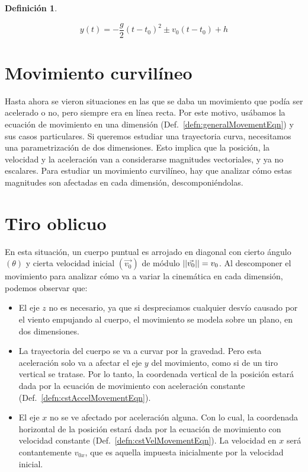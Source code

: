 \documentclass[a5paper,12pt,twoside]{book}
\newtheorem{defn}{{Definición}}[chapter]
\begin{document}
\begin{mdframed}[style=MyFrame1]
    \begin{defn}
    \end{defn}
    \begin{equation*}
        y(t) = -\frac{g}{2}(t-t_0)^2 \pm v_0(t-t_0) + h
    \end{equation*}
\end{mdframed}


\section{Movimiento curvilíneo}

Hasta ahora se vieron situaciones en las que se daba un movimiento que podía ser acelerado o no, pero siempre era en línea recta.
Por este motivo, usábamos la ecuación de movimiento en una dimensión (Def.\ \ref{defn:generalMovementEqn}) y sus casos particulares.
Si queremos estudiar una trayectoria curva, necesitamos una parametrización de dos dimensiones.
Esto implica que la posición, la velocidad y la aceleración van a considerarse magnitudes vectoriales, y ya no escalares.
Para estudiar un movimiento curvilíneo, hay que analizar cómo estas magnitudes son afectadas en cada dimensión, descomponiéndolas.


\section{Tiro oblicuo}
\label{subsec:parabolicMotion}

En esta situación, un cuerpo puntual es arrojado en diagonal con cierto ángulo $(\theta)$ y cierta velocidad inicial $(\Vec{v_0})$ de módulo ${\left|\left| {\Vec{v_0}} \right|\right|} = v_0$.
Al descomponer el movimiento para analizar cómo va a variar la cinemática en cada dimensión, podemos observar que:
\begin{itemize}
    \item
    El eje $z$ no es necesario, ya que si despreciamos cualquier desvío causado por el viento empujando al cuerpo, el movimiento se modela sobre un plano, en dos dimensiones.
    
    \item
    La trayectoria del cuerpo se va a curvar por la gravedad.
    Pero esta aceleración solo va a afectar el eje $y$ del movimiento, como si de un tiro vertical se tratase.
    Por lo tanto, la coordenada vertical de la posición estará dada por la ecuación de movimiento con aceleración constante (Def.\ \ref{defn:cstAccelMovementEqn}).
    
    \item
    El eje $x$ no se ve afectado por aceleración alguna.
    Con lo cual, la coordenada horizontal de la posición estará dada por la ecuación de movimiento con velocidad constante (Def.\ \ref{defn:cstVelMovementEqn}).
    La velocidad en $x$ será contantemente $v_{0x}$, que es aquella impuesta inicialmente por la velocidad inicial.
\end{itemize}
\end{document}

